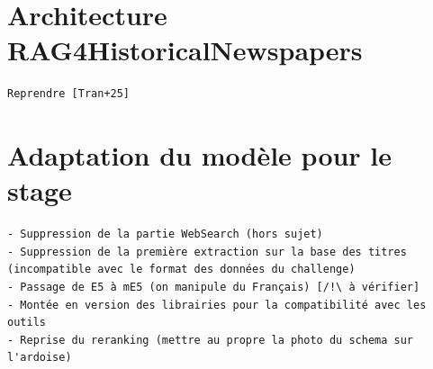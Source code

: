 \section{Architecture RAG4HistoricalNewspapers}

    \begin{verbatim}
Reprendre [Tran+25]
    \end{verbatim}

\section{Adaptation du modèle pour le stage}

    \begin{verbatim}
- Suppression de la partie WebSearch (hors sujet)
- Suppression de la première extraction sur la base des titres 
(incompatible avec le format des données du challenge)
- Passage de E5 à mE5 (on manipule du Français) [/!\ à vérifier]
- Montée en version des librairies pour la compatibilité avec les outils 
- Reprise du reranking (mettre au propre la photo du schema sur l'ardoise)
    \end{verbatim}